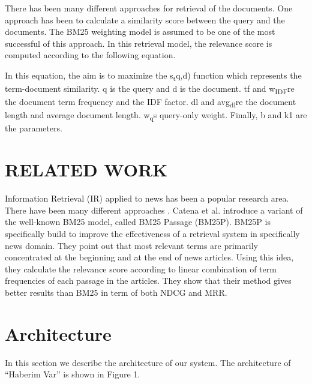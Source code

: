 \documentclass[conference]{IEEEtran}
\begin{document}
There has been many different approaches for retrieval of the documents. One approach has been to calculate a similarity score between the query and the documents. The BM25 weighting model is assumed to be one of the most successful of this approach. In this retrieval model, the relevance score is computed according to the following equation.

\begin{center}
\end{center}

In this equation, the aim is to maximize the \texorpdfstring{s\textsubscript{t}}(q,d) function which represents the term-document similarity. q is the query and d is the document. tf and \texorpdfstring{w\textsubscript{IDF}} are the document term frequency and the IDF factor. dl and \texorpdfstring{avg\textsubscript{dl}} are the document length and average document length. \texorpdfstring{w\textsubscript{q}} is query-only weight. Finally, b and k1 are the parameters.

\section{RELATED WORK}
Information Retrieval (IR) applied to news has been a popular research area. There have been many different approaches \cite{irbook}. Catena et al. \cite{enhanced_news_retrieval} introduce a variant of the well-known BM25 model, called BM25 Passage (BM25P). BM25P  is specifically build to improve the effectiveness of a retrieval system in specifically news domain. They point out that most relevant terms are primarily concentrated at the beginning and at the end of news articles. Using this idea, they calculate the relevance score according to linear combination of term frequencies of each passage in the articles. They show that their method gives better results than BM25 in term of both NDCG and MRR.

\section{Architecture}

In this section we describe the architecture of our system. The architecture of “Haberim Var” is shown in Figure 1.

\begin{center}
\end{center}
\end{document}
